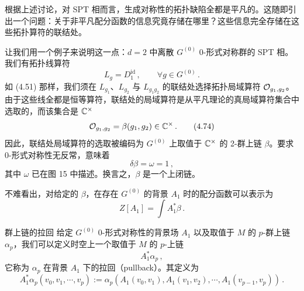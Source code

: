 

 根据上述讨论，对 SPT 相而言，生成对称性的拓扑缺陷全都是平凡的。这随即引出一个问题：关于非平凡配分函数的信息究竟存储在哪里？这些信息完全存储在这些拓扑算符的联结处。

让我们用一个例子来说明这一点：$d=2$ 中离散 $G^{(0)}$ 0-形式对称群的 SPT 相。我们有拓扑线算符
\begin{equation}
  L_g=D^{\mathrm{id}}_1\,,\qquad \forall g\in G^{(0)}\,. \tag{4.73}
\end{equation}
如 (4.51) 那样，我们须在 $L_{g_1}$、$L_{g_2}$ 与 $L_{g_1g_2}$ 的联结处选择拓扑局域算符 $\mathcal{O}_{g_1,g_2}$。由于这些线全都是恒等算符，联结处的局域算符是从平凡理论的真局域算符集合中选取的，而该集合是 $\mathbb{C}^\times$
\begin{equation}
  \mathcal{O}_{g_1,g_2}=\beta(g_1,g_2)\in\mathbb{C}^\times\,. \tag{4.74}
\end{equation}
因此，联结处局域算符的选取被编码为 $G^{(0)}$ 上取值于 $\mathbb{C}^\times$ 的 2-群上链 $\beta$。要求 0-形式对称性无反常，意味着
\begin{equation}
  \delta\beta=\omega=1\,, \tag{4.75}
\end{equation}
其中 $\omega$ 已在图 15 中描述。换言之，$\beta$ 是一个上闭链。

不难看出，对给定的 $\beta$，在存在 $G^{(0)}$ 的背景 $A_1$ 时的配分函数可以表示为
\begin{equation}
  Z[A_1]=\int A_1^*\beta\,. \tag{4.76}
\end{equation}

\begin{notebox}{群上链的拉回}
给定 $G^{(0)}$ 0-形式对称性的背景场 $A_1$ 以及取值于 $M$ 的 $p$-群上链 $\alpha_p$，我们可以定义时空上一个取值于 $M$ 的 $p$-上链
\begin{equation}
  A_1^*\alpha_p\,, \tag{4.77}
\end{equation}
它称为 $\alpha_p$ 在背景 $A_1$ 下的拉回（pullback）。其定义为
\begin{equation}
  A_1^*\alpha_p(v_0,v_1,\cdots,v_p):=\alpha_p\left(A_1(v_0,v_1),A_1(v_1,v_2),\cdots,A_1(v_{p-1},v_p)\right)\,. \tag{4.78}
\end{equation}
\end{notebox}

